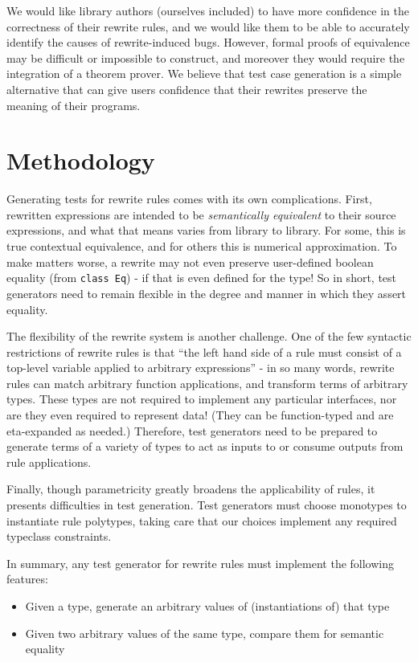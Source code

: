 \documentclass[format=sigconf, nonacm=true, review=true, screen=true]{acmart}
\begin{document}
We would like library authors (ourselves included) to have more confidence in the correctness of their rewrite rules, and we would like them to be able to accurately identify the causes of rewrite-induced bugs. However, formal proofs of equivalence may be difficult or impossible to construct, and moreover they would require the integration of a theorem prover. We believe that test case generation is a simple alternative that can give users confidence that their rewrites preserve the meaning of their programs.

\section{Methodology}

Generating tests for rewrite rules comes with its own complications. First, rewritten expressions are intended to be \textit{semantically equivalent} to their source expressions, and what that means varies from library to library. For some, this is true contextual equivalence, and for others this is numerical approximation. To make matters worse, a rewrite may not even preserve user-defined boolean equality (from \texttt{class Eq}) - if that is even defined for the type! So in short, test generators need to remain flexible in the degree and manner in which they assert equality.

The flexibility of the rewrite system is another challenge. One of the few syntactic restrictions of rewrite rules is that ``the left hand side of a rule must consist of a top-level variable applied to arbitrary expressions'' \cite{userguide} - in so many words, rewrite rules can match arbitrary function applications, and transform terms of arbitrary types. These types are not required to implement any particular interfaces, nor are they even required to represent data! (They can be function-typed and are eta-expanded as needed.) Therefore, test generators need to be prepared to generate terms of a variety of types to act as inputs to or consume outputs from rule applications.

Finally, though parametricity greatly broadens the applicability of rules, it presents difficulties in test generation. Test generators must choose monotypes to instantiate rule polytypes, taking care that our choices implement any required typeclass constraints.

In summary, any test generator for rewrite rules must implement the following features:

\begin{itemize}
  \item Given a type, generate an arbitrary values of (instantiations of) that type
  \item Given two arbitrary values of the same type, compare them for semantic equality
\end{itemize}
\end{document}
